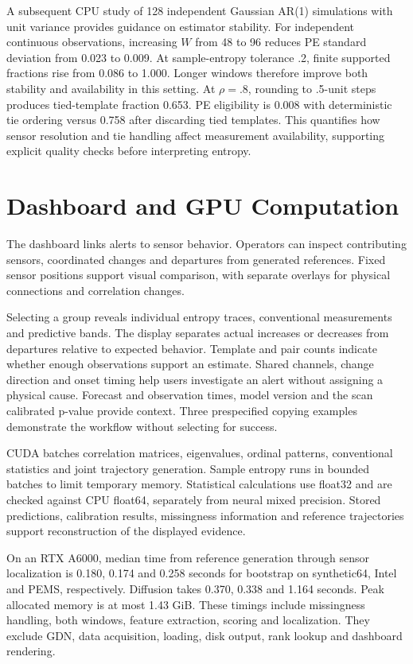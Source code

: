 \documentclass[conference]{IEEEtran}
\begin{document}
A subsequent CPU study of 128 independent Gaussian AR(1) simulations with
unit variance provides guidance on estimator stability. For independent
continuous observations, increasing $W$ from 48 to 96 reduces PE standard
deviation from 0.023 to 0.009. At sample-entropy tolerance .2, finite supported
fractions rise from 0.086 to 1.000. Longer windows therefore improve both
stability and availability in this setting. At $\rho=.8$, rounding to .5-unit
steps produces tied-template fraction 0.653. PE eligibility is 0.008 with
deterministic tie ordering versus 0.758 after discarding tied templates.
This quantifies how sensor resolution and tie handling affect measurement
availability, supporting explicit quality checks before interpreting entropy.







\section{Dashboard and GPU Computation}
The dashboard links alerts to sensor behavior. Operators can inspect
contributing sensors, coordinated changes and departures from generated
references. Fixed sensor positions support visual comparison, with separate
overlays for physical connections and correlation changes.

Selecting a group reveals individual entropy traces, conventional
measurements and predictive bands. The display separates actual increases
or decreases from departures relative to expected behavior. Template and
pair counts indicate whether enough observations support an estimate.
Shared channels, change direction and onset timing help users investigate
an alert without assigning a physical cause. Forecast and observation times,
model version and the scan calibrated p-value provide context.
Three prespecified copying examples demonstrate the workflow without
selecting for success.

CUDA batches correlation matrices, eigenvalues, ordinal patterns,
conventional statistics and joint trajectory generation. Sample entropy
runs in bounded batches to limit temporary memory. Statistical calculations
use float32 and are checked against CPU float64, separately from neural
mixed precision. Stored predictions, calibration results, missingness
information and reference trajectories support reconstruction of the
displayed evidence.

On an RTX A6000, median time from reference generation through sensor
localization is 0.180, 0.174 and 0.258 seconds for bootstrap on synthetic64,
Intel and PEMS, respectively. Diffusion takes 0.370, 0.338 and 1.164 seconds.
Peak allocated memory is at most 1.43 GiB.
These timings include missingness handling, both windows, feature
extraction, scoring and localization. They exclude GDN, data acquisition,
loading, disk output, rank lookup and dashboard rendering.
\end{document}
